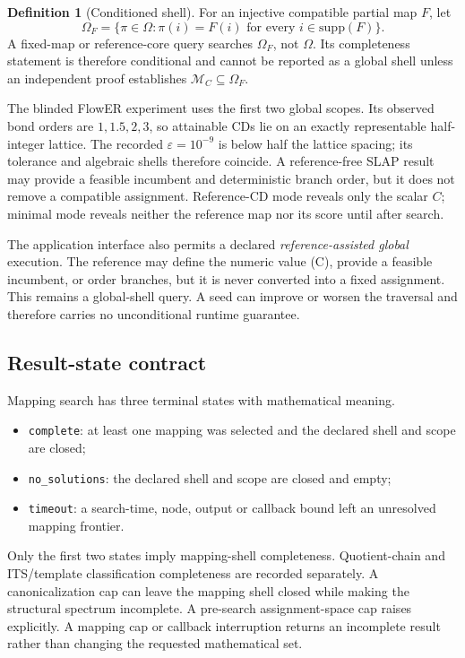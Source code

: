 \documentclass[11pt]{article}
\theoremstyle{definition}
\newtheorem{definition}[theorem]{Definition}
\newcommand{\supp}{\mathrm{supp}}
\begin{document}
\begin{definition}[Conditioned shell]
For an injective compatible partial map \(F\), let
\[
 \Omega_F=\{\pi\in\Omega:\pi(i)=F(i)\text{ for every }i\in\supp(F)\}.
\]
A fixed-map or reference-core query searches \(\Omega_F\), not \(\Omega\).
Its completeness statement is therefore conditional and cannot be reported as
a global shell unless an independent proof establishes
\(\mathcal M_C\subseteq\Omega_F\).
\end{definition}

The blinded FlowER experiment uses the first two global scopes.  Its observed
bond orders are \(1,1.5,2,3\), so attainable CDs lie on an exactly
representable half-integer lattice.  The recorded
\(\varepsilon=10^{-9}\) is below half the lattice spacing; its tolerance and
algebraic shells therefore coincide.  A reference-free SLAP result may provide
a feasible incumbent and deterministic
branch order, but it does not remove a compatible assignment.  Reference-CD
mode reveals only the scalar \(C\); minimal mode reveals neither the reference
map nor its score until after search.

The application interface also permits a declared \emph{reference-assisted
global} execution.  The reference may define the numeric value (C), provide a
feasible incumbent, or order branches, but it is never converted into a fixed
assignment.  This remains a global-shell query.  A seed can improve or worsen
the traversal and therefore carries no unconditional runtime guarantee.

\subsection{Result-state contract}

Mapping search has three terminal states with mathematical meaning.

\begin{itemize}
\item \texttt{complete}: at least one mapping was selected and the declared
  shell and scope are closed;
\item \texttt{no\_solutions}: the declared shell and scope are closed and
  empty;
\item \texttt{timeout}: a search-time, node, output or callback bound left an
  unresolved mapping frontier.
\end{itemize}

Only the first two states imply mapping-shell completeness.  Quotient-chain
and ITS/template classification completeness are recorded separately.  A
canonicalization cap can leave the mapping shell closed while making the
structural spectrum incomplete.  A pre-search assignment-space cap raises
explicitly.  A mapping cap or callback interruption returns an incomplete
result rather than changing the requested mathematical set.
\end{document}

